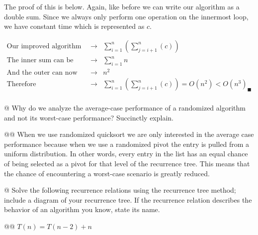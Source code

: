 \documentclass[10pt]{article}
\begin{document}
\begin{easylist}[enumerate]
        The proof of this is below. Again, like before we can write our algorithm as a double sum. Since we always only perform one operation on the innermost loop, we have constant time which is represented as $c$.

        \[
            \begin{aligned}
                \text{Our improved algorithm}             & \to & \sum^n_{i=1} \left( \sum^n_{j=i+1} \left( c \right) \right)\\
                \text{The inner sum can be rewritten}     & \to & \sum^n_{i=1} n\\
                \text{And the outer can now be rewritten} & \to & n^2\\
                \text{Therefore} & \to & \sum^n_{i=1} \left( \sum^n_{j=i+1} \left( c \right) \right) = O(n^2) < O(n^3)_\blacksquare\\
            \end{aligned}
        \]

    @ Why do we analyze the average-case performance of a randomized algorithm and not its worst-case performance? Succinctly explain.

    @@ When we use randomized quicksort we are only interested in the average case performance because when we use a randomized pivot the entry is pulled from a uniform distribution. In other words, every entry in the list has an equal chance of being selected as a pivot for that level of the recurrence tree. This means that the chance of encountering a worst-case scenario is greatly reduced.

    @ Solve the following recurrence relations using the recurrence tree method; include a diagram of your recurrence tree. If the recurrence relation describes the behavior of an algorithm you know, state its name.
    \clearpage

    @@ $T(n) = T(n-2) + n$

        \begin{figure}[!ht]
            \centering
        \end{figure}


\end{easylist}
\end{document}
